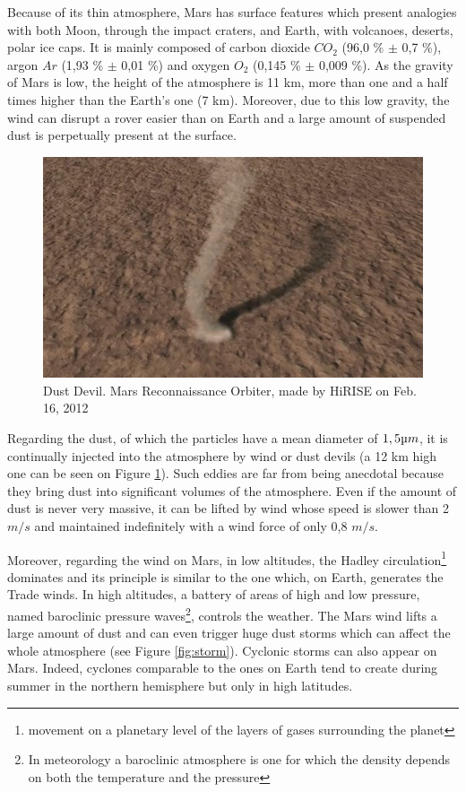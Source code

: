 Because of its thin atmosphere, Mars has surface features which present analogies with both Moon, through the impact craters, and Earth, with volcanoes, deserts, polar ice caps. It is mainly composed of carbon dioxide $CO_2$ (96,0 \% $\pm$ 0,7 \%), argon $Ar$ (1,93 \% $\pm$ 0,01 \%) and oxygen
$O_2$ (0,145 \% $\pm$ 0,009 \%). As the gravity of Mars is low, the height of the atmosphere is 11 km, more than one and a half times higher than the Earth's one (7 km). Moreover, due to this low gravity, the wind can disrupt a rover easier than on Earth and a large amount of suspended dust is perpetually present at the surface.

\begin{figure}[h]
  \centerline{\includegraphics[scale=0.47]{fig/poussiere.jpg}}
  \caption{Dust Devil. Mars Reconnaissance Orbiter, made by HiRISE on Feb. 16, 2012 \cite{dustDevil}}
  \label{fig:poussiere}
\end{figure}

Regarding the dust, of which the particles have a mean diameter of $1,5 \micro m$, it is continually injected into the atmosphere by wind or dust devils (a 12 km high one can be seen on Figure \ref{fig:poussiere}). Such eddies are far from being anecdotal because they bring dust into significant volumes of the atmosphere. Even if the amount of dust is never very massive, it can be lifted by wind whose speed is slower than 2 $m/s$ and maintained indefinitely with a wind force of only 0,8 $m/s$.

Moreover, regarding the wind on Mars, in low altitudes, the Hadley circulation\footnote{movement on a planetary level of the layers of gases surrounding the planet} dominates and its principle is similar to the one which, on Earth, generates the Trade winds. In high altitudes, a battery of areas of high and low pressure, named baroclinic pressure waves\footnote{In meteorology a baroclinic atmosphere is one for which the density depends on both the temperature and the pressure}, controls the weather. The Mars wind lifts a large amount of dust and can even trigger huge dust storms which can affect the whole atmosphere (see Figure \ref{fig:storm}). Cyclonic storms can also appear on Mars. Indeed, cyclones comparable to the ones on Earth tend to create during summer in the northern hemisphere but only in high latitudes.


